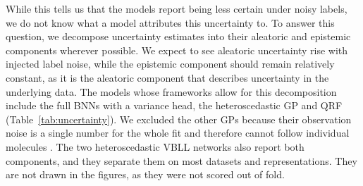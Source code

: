 While this tells us that the models report being less certain under noisy labels, we do not know what a model attributes this uncertainty to. To answer this question, we decompose uncertainty estimates into their aleatoric and epistemic components wherever possible. We expect to see aleatoric uncertainty rise with injected label noise, while the epistemic component should remain relatively constant, as it is the aleatoric component that describes uncertainty in the underlying data. The models whose frameworks allow for this decomposition include the full BNNs with a variance head, the heteroscedastic GP and QRF \citep{kendall2017, Rasmussen2005, Meinshausen2006} (Table~\ref{tab:uncertainty}). We excluded the other GPs because their observation noise is a single number for the whole fit and therefore cannot follow individual molecules \citep{Rasmussen2005}. The two heteroscedastic VBLL networks also report both components, and they separate them on most datasets and representations. They are not drawn in the figures, as they were not scored out of fold.

